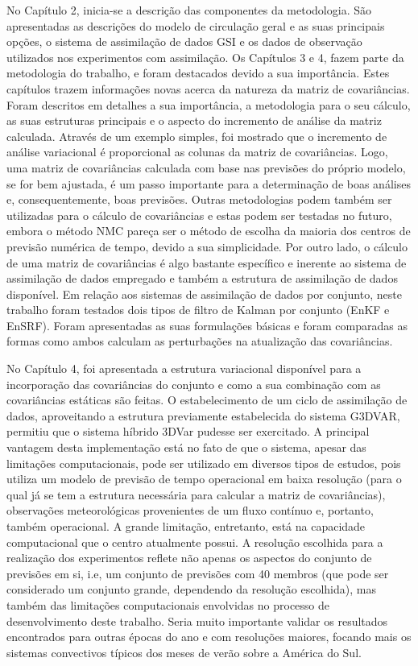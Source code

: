 No Capítulo 2, inicia-se a descrição das componentes da metodologia. São apresentadas as descrições do modelo de circulação geral e as suas principais opções, o sistema de assimilação de dados GSI e os dados de observação utilizados nos experimentos com assimilação. Os Capítulos 3 e 4, fazem parte da metodologia do trabalho, e foram destacados devido a sua importância. Estes capítulos trazem informações novas acerca da natureza da matriz de covariâncias. Foram descritos em detalhes a sua importância, a metodologia para o seu cálculo, as suas estruturas principais e o aspecto do incremento de análise da matriz calculada. Através de um exemplo simples, foi mostrado que o incremento de análise variacional é proporcional as colunas da matriz de covariâncias. Logo, uma matriz de covariâncias calculada com base nas previsões do próprio modelo, se for bem ajustada, é um passo importante para a determinação de boas análises e, consequentemente, boas previsões. Outras metodologias podem também ser utilizadas para o cálculo de covariâncias e estas podem ser testadas no futuro, embora o método NMC pareça ser o método de escolha da maioria dos centros de previsão numérica de tempo, devido a sua simplicidade. Por outro lado, o cálculo de uma matriz de covariâncias é algo bastante específico e inerente ao sistema de assimilação de dados empregado e também a estrutura de assimilação de dados disponível. Em relação aos sistemas de assimilação de dados por conjunto, neste trabalho foram testados dois tipos de filtro de Kalman por conjunto (EnKF e EnSRF). Foram apresentadas as suas formulações básicas e foram comparadas as formas como ambos calculam as perturbações na atualização das covariâncias.

No Capítulo 4, foi apresentada a estrutura variacional disponível para a incorporação das covariâncias do conjunto e como a sua combinação com as covariâncias estáticas são feitas. O estabelecimento de um ciclo de assimilação de dados, aproveitando a estrutura previamente estabelecida do sistema G3DVAR, permitiu que o sistema híbrido 3DVar pudesse ser exercitado. A principal vantagem desta implementação está no fato de que o sistema, apesar das limitações computacionais, pode ser utilizado em diversos tipos de estudos, pois utiliza um modelo de previsão de tempo operacional em baixa resolução (para o qual já se tem a estrutura necessária para calcular a matriz de covariâncias), observações meteorológicas provenientes de um fluxo contínuo e, portanto, também operacional. A grande limitação, entretanto, está na capacidade computacional que o centro atualmente possui. A resolução escolhida para a realização dos experimentos reflete não apenas os aspectos do conjunto de previsões em si, i.e, um conjunto de previsões com 40 membros (que pode ser considerado um conjunto grande, dependendo da resolução escolhida), mas também das limitações computacionais envolvidas no processo de desenvolvimento deste trabalho. Seria muito importante validar os resultados encontrados para outras épocas do ano e com resoluções maiores, focando mais os sistemas convectivos típicos dos meses de verão sobre a América do Sul.

